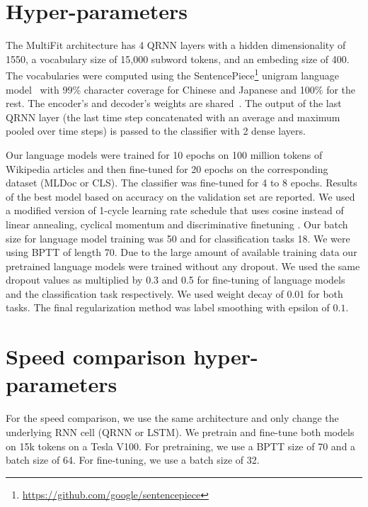 \documentclass[11pt,a4paper]{article}
\begin{document}



\newpage
\newpage

\appendix

\section{Hyper-parameters}
The MultiFit architecture has 4 QRNN layers with a hidden dimensionality of 1550, a vocabulary size of 15,000 subword tokens, and an embeding size of 400. The vocabularies were computed using the SentencePiece\footnote{\url{https://github.com/google/sentencepiece}} unigram language model~\cite{Kudo2018} with 99\% character coverage for Chinese and Japanese and 100\% for the rest. The encoder's and decoder's weights are shared~\cite{Press2017}. The output of the last QRNN layer (the last time step concatenated with an average and maximum pooled over time steps) is passed to the classifier with 2 dense layers.

Our language models were trained for 10 epochs on 100 million tokens of Wikipedia articles and then fine-tuned for 20 epochs on the corresponding dataset (MLDoc or CLS). The classifier was fine-tuned for 4 to 8 epochs. Results of the best model based on accuracy on the validation set are reported. We used a modified version of 1-cycle learning rate schedule \cite{smith2018disciplined} that uses cosine instead of linear annealing, cyclical momentum and discriminative finetuning \cite{Howard2018}. Our batch size for language model training was 50 and for classification tasks 18. We were using BPTT of length 70. Due to the large amount of available training data our pretrained language models were trained without any dropout. We used the same dropout values as \cite{Howard2018} multiplied by 0.3 and 0.5 for fine-tuning of language models and the classification task respectively. We used weight decay of 0.01 for both tasks. The final regularization method was label smoothing \cite{Szegedy2016} with epsilon of $0.1$.

\section{Speed comparison hyper-parameters}

For the speed comparison, we use the same architecture and only change the underlying RNN cell (QRNN or LSTM). We pretrain and fine-tune both models on 15k tokens on a Tesla V100. For pretraining, we use a BPTT size of 70 and a batch size of 64. For fine-tuning, we use a batch size of 32.
\end{document}
